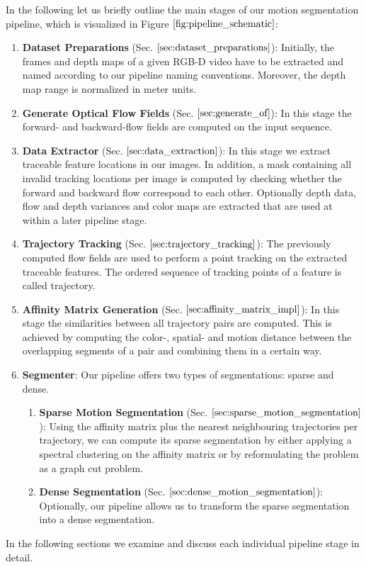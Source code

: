 In the following let us briefly outline the main stages of our motion segmentation pipeline, which is visualized in Figure $\ref{fig:pipeline_schematic}$:
\begin{enumerate}
\item \textbf{Dataset Preparations} (Sec. $\ref{sec:dataset_preparations}$): Initially, the frames and depth maps of a given RGB-D video have to be extracted and named according to our pipeline naming conventions. Moreover, the depth map range is normalized in meter units.
\item \textbf{Generate Optical Flow Fields} (Sec. $\ref{sec:generate_of}$): In this stage the forward- and backward-flow fields are computed on the input sequence.
\item \textbf{Data Extractor} (Sec. $\ref{sec:data_extraction}$): In this stage we extract traceable feature locations in our images. In addition, a mask containing all invalid tracking locations per image is computed by checking whether the forward and backward flow correspond to each other. Optionally depth data, flow and depth variances and color maps are extracted that are used at within a later pipeline stage. 
\item \textbf{Trajectory Tracking} (Sec. $\ref{sec:trajectory_tracking}$): The previously computed flow fields are used to perform a point tracking on the extracted traceable features. The ordered sequence of tracking points of a feature is called trajectory.
\item \textbf{Affinity Matrix Generation} (Sec. $\ref{sec:affinity_matrix_impl}$): In this stage the similarities between all trajectory pairs are computed. This is achieved by computing the color-, spatial- and motion distance between the overlapping segments of a pair and combining them in a certain way.
\item \textbf{Segmenter}: Our pipeline offers two types of segmentations: sparse and dense. 
	\begin{enumerate}
	\item \textbf{Sparse Motion Segmentation} (Sec. $\ref{sec:sparse_motion_segmentation}$): Using the affinity matrix plus the nearest neighbouring trajectories per trajectory, we can compute its sparse segmentation by either applying a spectral clustering on the affinity matrix or by reformulating the problem as a graph cut problem. 
	\item \textbf{Dense Segmentation} (Sec. $\ref{sec:dense_motion_segmentation}$): Optionally, our pipeline allows us to transform the sparse segmentation into a dense segmentation. 	
	\end{enumerate}
\end{enumerate}
In the following sections we examine and discuss each individual pipeline stage in detail. 

